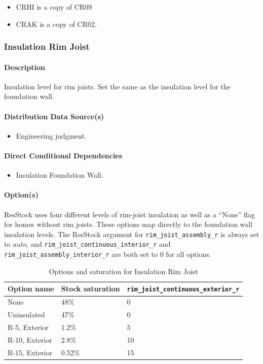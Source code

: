 \begin{itemize}
 
\item
  CRHI is a copy of CR09
\item
  CRAK is a copy of CR02.
\end{itemize}





\subsubsection{Insulation Rim Joist}\label{insulation_rim_joist}
\paragraph{Description}
Insulation level for rim joists. Set the same as the insulation level for the foundation wall.

\paragraph{Distribution Data Source(s)}
\begin{itemize}
 
\item
  Engineering judgment.
\end{itemize}
\paragraph{Direct Conditional Dependencies}

\begin{itemize}
    \item Insulation Foundation Wall.
\end{itemize}

\paragraph{Option(s)}
ResStock uses four different levels of rim-joist insulation as well as a ``None'' flag for homes without rim joists. These options map directly to the foundation wall insulation levels. The ResStock argument for 
\texttt{rim\_joist\_assembly\_r} is always set to \textit{auto}, and 
\texttt{rim\_joist\_continuous\_interior\_r} and
\texttt{rim\_joist\_assembly\_interior\_r} are both set to 0 for all options.


\begin{longtable}[]{|p{3.5cm}|p{1.5cm}|p{3.5cm}|}
\caption{Options and saturation for Insulation Rim Joist} \\
\toprule\noalign{}
Option name & Stock saturation & 
\texttt{rim\_joist\_continuous\_exterior\_r} 
 \\
\midrule\noalign{}
\endhead
\bottomrule\noalign{}
\endlastfoot
None & 48\% &  0  \\
Uninsulated & 47\% &  0 \\
R-5, Exterior & 1.2\% & 5\\
R-10, Exterior & 2.8\% &  10  \\
R-15, Exterior & 0.52\%  & 15  \\
\end{longtable}

